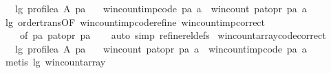 \begin{isabellebody}
\ \ \ lg{\isacharcolon}{\kern0pt}\ {\isachardoublequoteopen}{\isacharparenleft}{\kern0pt}profile{\isacharunderscore}{\kern0pt}a\ A\ pa{\isacharparenright}{\kern0pt}{\isachardoublequoteclose}\isanewline
\ \ \ {\isachardoublequoteopen}win{\isacharunderscore}{\kern0pt}count{\isacharunderscore}{\kern0pt}imp{\isacharunderscore}{\kern0pt}code\ pa\ a\ {\isacharequal}{\kern0pt}\ win{\isacharunderscore}{\kern0pt}count\ {\isacharparenleft}{\kern0pt}pa{\isacharunderscore}{\kern0pt}to{\isacharunderscore}{\kern0pt}pr\ pa{\isacharparenright}{\kern0pt}\ a{\isachardoublequoteclose}\isanewline
%
\isadelimproof
\ \ %
\endisadelimproof
%
\isatagproof
{}\isamarkupfalse%
\ lg\ order{\isacharunderscore}{\kern0pt}trans{\isacharbrackleft}{\kern0pt}OF\ win{\isacharunderscore}{\kern0pt}count{\isacharunderscore}{\kern0pt}imp{\isacharunderscore}{\kern0pt}code{\isachardot}{\kern0pt}refine\ win{\isacharunderscore}{\kern0pt}count{\isacharunderscore}{\kern0pt}imp{}{\isacharunderscore}{\kern0pt}correct{\isacharcomma}{\kern0pt}\isanewline
\ \ \ \ of\ pa\ {\isachardoublequoteopen}{\isacharparenleft}{\kern0pt}pa{\isacharunderscore}{\kern0pt}to{\isacharunderscore}{\kern0pt}pr\ pa{\isacharparenright}{\kern0pt}{\isachardoublequoteclose}{\isacharbrackright}{\kern0pt}\isanewline
\ \ \isamarkupfalse%
\ {\isacharparenleft}{\kern0pt}auto\ simp{\isacharcolon}{\kern0pt}\ refine{\isacharunderscore}{\kern0pt}rel{\isacharunderscore}{\kern0pt}defs{\isacharparenright}{\kern0pt}%
\endisatagproof
{\isafoldproof}%
%
\isadelimproof
\isanewline
%
\endisadelimproof
\isanewline
{}\isamarkupfalse%
\ win{\isacharunderscore}{\kern0pt}count{\isacharunderscore}{\kern0pt}array{\isacharunderscore}{\kern0pt}code{\isacharunderscore}{\kern0pt}correct{\isacharcolon}{\kern0pt}\ \isanewline
\ \ \ lg{\isacharcolon}{\kern0pt}\ {\isachardoublequoteopen}{\isacharparenleft}{\kern0pt}profile{\isacharunderscore}{\kern0pt}a\ A\ pa{\isacharparenright}{\kern0pt}{\isachardoublequoteclose}\isanewline
\ \ \ {\isachardoublequoteopen}win{\isacharunderscore}{\kern0pt}count\ {\isacharparenleft}{\kern0pt}pa{\isacharunderscore}{\kern0pt}to{\isacharunderscore}{\kern0pt}pr\ pa{\isacharparenright}{\kern0pt}\ a\ {\isacharequal}{\kern0pt}\ win{\isacharunderscore}{\kern0pt}count{\isacharunderscore}{\kern0pt}imp{\isacharunderscore}{\kern0pt}code\ pa\ a{\isachardoublequoteclose}\isanewline
%
\isadelimproof
\ \ %
\endisadelimproof
%
\isatagproof
{}\isamarkupfalse%
\ {\isacharparenleft}{\kern0pt}metis\ lg\ win{\isacharunderscore}{\kern0pt}count{\isacharunderscore}{\kern0pt}array{\isacharparenright}{\kern0pt}%

\end{isabellebody}
